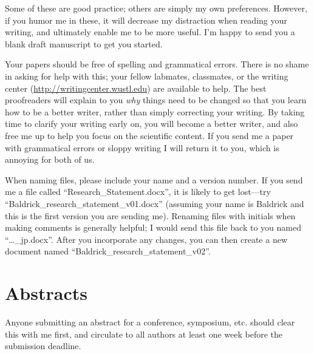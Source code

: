 \documentclass[letterpaper,12pt,oneside]{memoir}
\begin{document}
Some of these are  good practice; others are simply my own preferences. However, if you humor me in these, it will decrease my distraction when reading your writing, and ultimately enable me to be more useful. I'm happy to send you a blank draft manuscript to get you started.

Your papers should be free of spelling and grammatical errors. There is no shame in asking for help with this; your fellow labmates, classmates, or the writing center (\url{http://writingcenter.wustl.edu}) are available to help. The best proofreaders will explain to you \textit{why} things need to be changed so that you learn how to be a better writer, rather than simply correcting your writing. By taking time to clarify your writing early on, you will become a better writer, and also free me up to help you focus on the scientific content. If you send me a paper with grammatical errors or sloppy writing I will return it to you, which is annoying for both of us.


 \begin{shaded}
\noindent When naming files, please include your name and a version number. If you send me a file called ``Research\_Statement.docx'', it is likely to get lost---try ``Baldrick\_research\_statement\_v01.docx'' (assuming your name is Baldrick and this is the first version you are sending me). Renaming files with initials when making comments is generally helpful; I would send this file back to you named ``\ldots\_jp.docx''. After you incorporate any changes, you can then create a new document named ``Baldrick\_research\_statement\_v02''.
\end{shaded}




\section{Abstracts}
Anyone submitting an abstract for a conference, symposium, etc. should clear this with me first, and circulate to all authors at least one week before the submission deadline.
\end{document}
